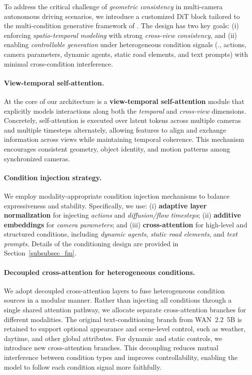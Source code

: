 To address the critical challenge of \emph{geometric consistency} in multi-camera autonomous driving scenarios, we introduce a customized DiT block tailored to the multi-condition generative framework of \modelname. The design has two key goals: (i) enforcing \emph{spatio-temporal modeling} with strong \emph{cross-view consistency}, and (ii) enabling \emph{controllable generation} under heterogeneous condition signals (\eg., actions, camera parameters, dynamic agents, static road elements, and text prompts) with minimal cross-condition interference.

\paragraph{View-temporal self-attention.}
At the core of our architecture is a \textbf{view-temporal self-attention} module that explicitly models interactions along both the \emph{temporal} and \emph{cross-view} dimensions. Concretely, self-attention is executed over latent tokens across multiple cameras and multiple timesteps alternately, allowing features to align and exchange information across views while maintaining temporal coherence. This mechanism encourages consistent geometry, object identity, and motion patterns among synchronized cameras.

\paragraph{Condition injection strategy.}
We employ modality-appropriate condition injection mechanisms to balance expressiveness and stability. Specifically, we use:
(i) \textbf{adaptive layer normalization} for injecting \emph{actions} and \emph{diffusion/flow timesteps};
(ii) \textbf{additive embeddings} for \emph{camera parameters};
and (iii) \textbf{cross-attention} for high-level and structured conditions, including \emph{dynamic agents}, \emph{static road elements}, and \emph{text prompts}. Details of the conditioning design are provided in Section~\ref{subsubsec_fm}.

\paragraph{Decoupled cross-attention for heterogeneous conditions.}
We adopt decoupled cross-attention layers to fuse heterogeneous condition sources in a modular manner. Rather than injecting all conditions through a single shared attention pathway, we allocate separate cross-attention branches for different modalities.
%
The original text-conditioning branch from WAN~2.2~5B is retained to support optional appearance and scene-level control, such as weather, daytime, and other global attributes. For dynamic and static controls, we introduce new cross-attention branches.
This decoupling reduces mutual interference between condition types and improves controllability, enabling the model to follow each condition signal more faithfully.

